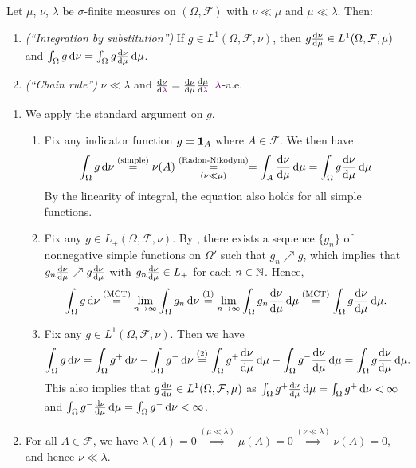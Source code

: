 \begin{enumerate}
Let \(\mu\), \(\nu\), \(\lambda\) be \(\sigma\)-finite measures on
\((\Omega,\mathcal{F})\) with \(\nu\ll\mu\) and \(\mu\ll\lambda\). Then:
\begin{enumerate}
\item\label{it:rn-deriv-int-sub} \emph{(``Integration by substitution'')} If \(g\in
L^{1}(\Omega,\mathcal{F},\nu)\), then \(g\odv{\nu}{\mu}\in
L^{1}(\Omega,\mathcal{F},\mu)\) and
\(\int_{\Omega}^{}g\odif{\nu}=\int_{\Omega}^{}g\odv{\nu}{\mu}\odif{\mu}\).
\item\label{it:rn-deriv-chain-rule} \emph{(``Chain rule'')} \(\nu\ll\lambda\) and
\(\odv{\nu}{\vc{\lambda}}=\odv{\nu}{\mu}\odv{\mu}{\vc{\lambda}}\) \(\vc{\lambda}\)-a.e.
\end{enumerate}
\begin{pf}
\begin{enumerate}
\item We apply the standard argument on \(g\).
\begin{enumerate}[label={(\arabic*)}]
\item Fix any indicator function \(g=\mathbf{1}_{A}\) where \(A\in\mathcal{F}\). We
then have
\[
\int_{\Omega}^{}g\odif{\nu}\overset{\text{(simple)}}{=}\nu(A)\underset{(\nu\ll\mu)}{\overset{\text{(Radon-Nikodym)}}{=}}
=\int_{A}^{}\odv{\nu}{\mu}\odif{\mu} =\int_{\Omega}^{}g\odv{\nu}{\mu}\odif{\mu}
\]
By the linearity of integral, the equation also holds for all simple functions.
\item Fix any \(g\in L_{+}(\Omega,\mathcal{F},\nu)\). By ,
there exists a sequence \(\{g_n\}\) of nonnegative simple functions on
\(\Omega'\) such that \(g_n\nearrow g\), which implies that
\(g_n\odv{\nu}{\mu}\nearrow g\odv{\nu}{\mu}\) with \(g_n\odv{\nu}{\mu}\in
L_{+}\) for each \(n\in\mathbb{N}\). Hence,
\[
\int_{\Omega}^{}g\odif{\nu}\overset{\text{(MCT)}}{=}
\lim_{n\to\infty}\int_{\Omega}^{}g_n\odif{\nu}
\overset{(1)}{=}\lim_{n\to\infty}\int_{\Omega}^{}g_n\odv{\nu}{\mu}\odif{\mu}
\overset{\text{(MCT)}}{=}\int_{\Omega}^{}g\odv{\nu}{\mu}\odif{\mu}.
\]
\item Fix any \(g\in L^{1}(\Omega,\mathcal{F},\nu)\). Then we have
\[
\int_{\Omega}^{}g\odif{\nu}=\int_{\Omega}^{}g^{+}\odif{\nu}-\int_{\Omega}^{}g^{-}\odif{\nu}
\overset{(2)}{=}\int_{\Omega}^{}g^{+}\odv{\nu}{\mu}\odif{\mu}
-\int_{\Omega}^{}g^{-}\odv{\nu}{\mu}\odif{\mu}
=\int_{\Omega}^{}g\odv{\nu}{\mu}\odif{\mu}.
\]
This also implies that \(g\odv{\nu}{\mu}\in L^{1}(\Omega,\mathcal{F},\mu)\) as
\(\int_{\Omega}^{}g^{+}\odv{\nu}{\mu}\odif{\mu}=\int_{\Omega}^{}g^{+}\odif{\nu}<\infty\)
and \(\int_{\Omega}^{}g^{-}\odv{\nu}{\mu}\odif{\mu}=\int_{\Omega}^{}g^{-}\odif{\nu}<\infty\).
\end{enumerate}
\item For all \(A\in\mathcal{F}\), we have
\(\lambda(A)=0\overset{(\mu\ll\lambda)}{\implies }\mu(A)=0
\overset{(\nu\ll\lambda)}{\implies }\nu(A)=0\), and hence \(\nu\ll\lambda\).


\end{enumerate}
\end{pf}
\end{enumerate}
